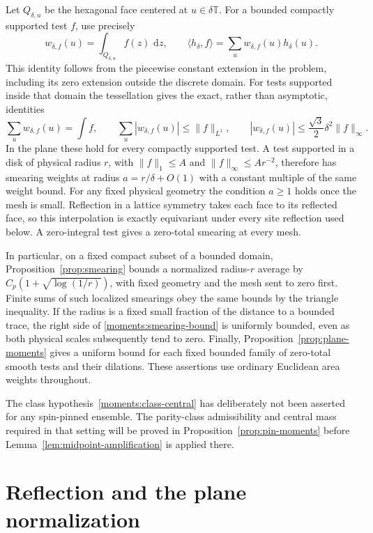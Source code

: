 \documentclass[11pt]{article}
\theoremstyle{definition}
\theoremstyle{remark}
\numberwithin{equation}{section}
\begin{document}
Let $Q_{\delta,u}$ be the hexagonal face centered at $u\in\delta\mathbb T$.
For a bounded compactly supported test $f$, use precisely
\begin{equation}\label{moments:area-weights}
 w_{\delta,f}(u)=\int_{Q_{\delta,u}}f(z)\,\,\mathrm d z,
 \qquad
 \langle h_\delta,f\rangle
 =\sum_u w_{\delta,f}(u)h_\delta(u).
\end{equation}
This identity follows from the piecewise constant extension in the
problem, including its zero extension outside the discrete domain.
For tests supported inside that domain the tessellation gives the
exact, rather than asymptotic, identities
\[
 \sum_u w_{\delta,f}(u)=\int f,
 \qquad \sum_u|w_{\delta,f}(u)|\leq\|f\|_{L^1},
 \qquad |w_{\delta,f}(u)|\leq\frac{\sqrt3}{2}\delta^2\|f\|_\infty.
\]
In the plane these hold for every compactly supported test.  A test
supported in a disk of physical radius $r$, with
$\|f\|_1\leq A$ and $\|f\|_\infty\leq Ar^{-2}$, therefore has
smearing weights at radius $a=r/\delta+O(1)$ with a constant multiple
of the same weight bound.  For any fixed physical geometry the
condition $a\geq1$ holds once the mesh is small.  Reflection in a
lattice symmetry takes each face to its reflected face, so this
interpolation is exactly equivariant under every site reflection used
below.  A zero-integral test gives a zero-total smearing at every mesh.

In particular, on a fixed compact subset of a bounded domain,
Proposition~\ref{prop:smearing} bounds a normalized radius-$r$ average
by $C_p(1+\sqrt{\log(1/r)})$, with fixed geometry and the mesh sent
to zero first.  Finite sums of such localized smearings obey the same
bounds by the triangle inequality.  If the radius is a fixed small
fraction of the distance to a bounded trace, the right side of
\eqref{moments:smearing-bound} is uniformly bounded, even as both
physical scales subsequently tend to zero.  Finally,
Proposition~\ref{prop:plane-moments} gives a uniform bound for each
fixed bounded family of zero-total smooth tests and their dilations.
These assertions use ordinary Euclidean area weights throughout.

The class hypothesis~\eqref{moments:class-central} has deliberately
not been asserted for any spin-pinned ensemble.  The parity-class
admissibility and central mass required in that setting will be proved
in Proposition~\ref{prop:pin-moments} before
Lemma~\ref{lem:midpoint-amplification} is applied there.

\section{Reflection and the plane normalization}
\label{sec:plane}
\end{document}
